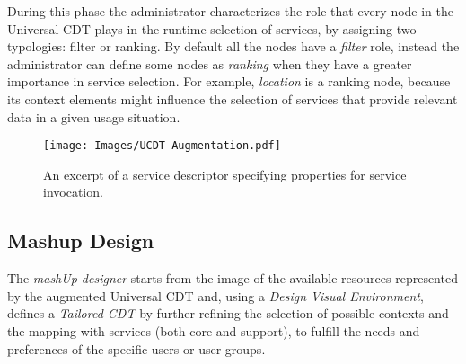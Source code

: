 During this phase the administrator characterizes the role that every node in the Universal CDT plays in the runtime selection of services, by assigning two typologies: filter or ranking. By default all the nodes have a \emph{filter} role, instead the administrator can define some nodes as \emph{ranking} when they have a greater importance in service selection. For example, \emph{location} is a ranking node, because its context elements might influence the selection of services that provide relevant data in a given usage situation.
%
\begin{figure} [t]
\centering
\texttt{[image: Images/UCDT-Augmentation.pdf]}
\caption{An excerpt of a service descriptor specifying properties for service invocation.}
\label{fig:UCDTAugmentation}
\end{figure}
%
        

\subsection{Mashup Design}
\label{subsec:mashupDesign}
The \emph{mashUp designer} starts from the image of the available resources represented by the augmented Universal CDT and, using a \emph{Design Visual Environment}, defines a \emph{Tailored CDT} by further refining the selection of possible contexts and the mapping with services (both core and support), to fulfill the needs and preferences of the specific users or user groups. %

